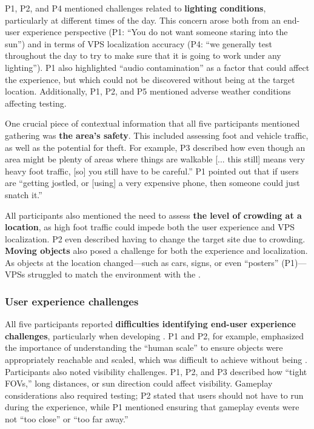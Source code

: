 P1, P2, and P4 mentioned challenges related to \textbf{lighting conditions}, particularly at different times of the day. This concern arose both from an end-user experience perspective (\eg P1: ``You do not want someone staring into the sun'') and in terms of VPS localization accuracy (\eg P4: ``we generally test throughout the day to try to make sure that it is going to work under any lighting''). P1 also highlighted ``audio contamination'' as a factor that could affect the experience, but which could not be discovered without being at the target location. Additionally, P1, P2, and P5 mentioned adverse weather conditions affecting \insitu testing.

One crucial piece of contextual information that all five participants mentioned gathering \insitu[ ] was \textbf{the area's safety}. This included assessing foot and vehicle traffic, as well as the potential for theft. For example, P3 described how even though an area might be plenty of areas where things are walkable [... this still] means very heavy foot traffic, [so] you still have to be careful.'' P1 pointed out that if users are ``getting jostled, or [using] a very expensive phone, then someone could just snatch it.''

All participants also mentioned the need to assess \textbf{the level of crowding at a location}, as high foot traffic could impede both the user experience and VPS localization. P2 even described having to change the target site due to crowding. \textbf{Moving objects} also posed a challenge for both the experience and localization. As objects at the location changed---such as cars, signs, or even ``posters'' (P1)---VPSs struggled to match the environment with the \locMeshes.

\subsubsection{User experience challenges}
All five participants reported \textbf{difficulties identifying end-user experience challenges}, particularly when developing \exsitu[ ]. P1 and P2, for example, emphasized the importance of understanding the ``human scale'' to ensure objects were appropriately reachable and scaled, which was difficult to achieve without being \insitu[ ]. Participants also noted visibility challenges. P1, P2, and P3 described how ``tight FOVs,'' long distances, or sun direction could affect visibility. Gameplay considerations also required \insitu testing; P2 stated that users should not have to run during the experience, while P1 mentioned ensuring that gameplay events were not ``too close'' or ``too far away.''

